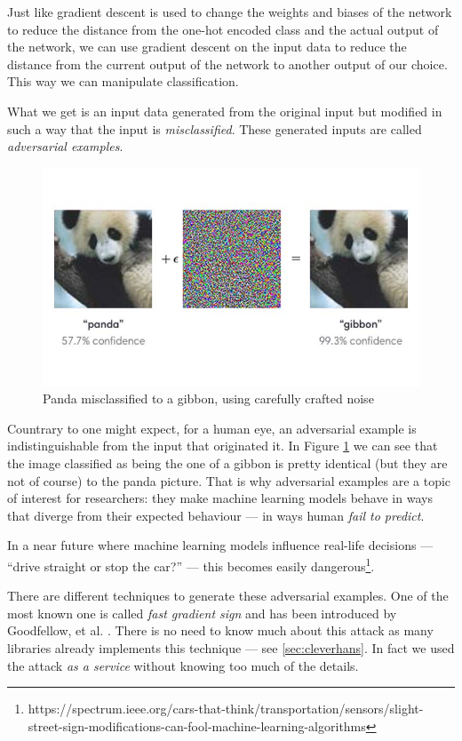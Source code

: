 Just like gradient descent is used to change the weights and biases of
the network to reduce the distance from the one-hot encoded class and
the actual output of the network, we can use gradient descent on the
input data to reduce the distance from the current output of the network to
another output of our choice. This way we can manipulate classification.

What we get is an input data generated from the original input but
modified in such a way that the input is \emph{misclassified}. These
generated inputs are called \emph{adversarial examples}.

\begin{figure}
  \centering
  \includegraphics[width=0.5\linewidth]{Images/panda-gibbon.jpg}
  \caption{Panda misclassified to a gibbon, using carefully crafted
    noise}
  \label{fig:panda-gibbon}
\end{figure}

Countrary to one might expect, for a human eye, an adversarial example
is indistinguishable from the input that originated it. In Figure
\ref{fig:panda-gibbon} we can see that the image classified as being
the one of a gibbon is pretty identical (but they are not of course) to
the panda picture. That is why adversarial examples are a topic of
interest for researchers: they make machine learning models behave in
ways that diverge from their expected behaviour --- in ways human
\emph{fail to predict}.

In a near future where machine learning models influence real-life
decisions --- ``drive straight or stop the car?'' --- this becomes
easily dangerous\footnote{https://spectrum.ieee.org/cars-that-think/transportation/sensors/slight-street-sign-modifications-can-fool-machine-learning-algorithms}.

There are different techniques to generate these adversarial examples.
One of the most known one is called \emph{fast gradient sign} and has been
introduced by Goodfellow, et al. \cite{goodfellow6572explaining}.
There is no need to know much about this attack as many libraries
already implements this technique --- see \ref{sec:cleverhans}. In fact
we used the attack \emph{as a service} without knowing too much of the
details.
